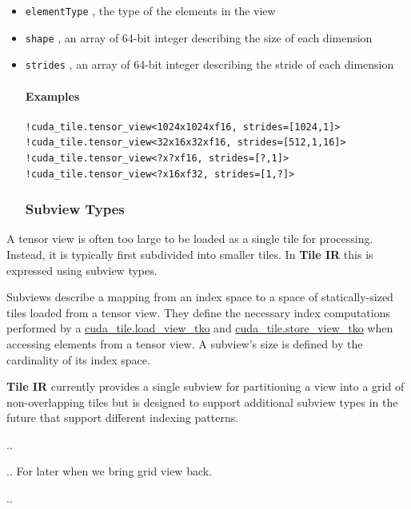 \documentclass{article}
\begin{document}
\begin{itemize}
\item \texttt{elementType} , the type of the elements in the view
\item \texttt{shape} , an array of 64-bit integer describing the size of each dimension
\item \texttt{strides} , an array of 64-bit integer describing the stride of each dimension

\paragraph{Examples}

\begin{lstlisting}
!cuda_tile.tensor_view<1024x1024xf16, strides=[1024,1]>
!cuda_tile.tensor_view<32x16x32xf16, strides=[512,1,16]>
!cuda_tile.tensor_view<?x?xf16, strides=[?,1]>
!cuda_tile.tensor_view<?x16xf32, strides=[1,?]>
\end{lstlisting}


\subsubsection{Subview Types}

\end{itemize}
A tensor view is often too large to be loaded as a single tile for processing. Instead, it is typically first subdivided into smaller tiles. In \textbf{Tile IR} this is expressed using subview types.


Subviews describe a mapping from an index space to a space of statically-sized tiles loaded from a tensor view. They define the necessary index computations performed by a \href{https://docs.nvidia.com/cuda/tile-ir/latest/sections/operations.html#op-cuda-tile-load-view-tko}{cuda\_tile.load\_view\_tko} and \href{https://docs.nvidia.com/cuda/tile-ir/latest/sections/operations.html#op-cuda-tile-store-view-tko}{cuda\_tile.store\_view\_tko} when accessing elements from a tensor view. A subview's size is defined by the cardinality of its index space.


\textbf{Tile IR} currently provides a single subview for partitioning a view into a grid of non-overlapping tiles but is designed to support additional subview types in the future that support different indexing patterns.

..

.. For later when we bring grid view back.

..
\end{document}
